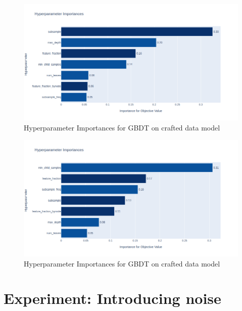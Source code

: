 \begin{figure}[h]
	\centering
	\includegraphics[width=\linewidth]{figures/HPO/RF_HPO_Raw_Importances.png}
	\caption{Hyperparameter Importances for GBDT on crafted data model}
	\label{fig:RF_HPO_Raw_Importances}
\end{figure}
\begin{figure}[h]
	\centering
	\includegraphics[width=\linewidth]{figures/HPO/RF_HPO_Crafted_Importances.png}
	\caption{Hyperparameter Importances for GBDT on crafted data model}
	\label{fig:RF_HPO_Crafted_Importances}
\end{figure}


\section{Experiment: Introducing noise}







